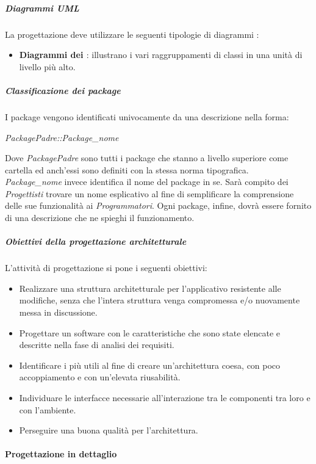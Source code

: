 \subparagraph{Diagrammi UML}
La progettazione deve utilizzare le seguenti tipologie di diagrammi :
\begin{itemize}
\item
\textbf{Diagrammi dei \textit{}}: illustrano i vari raggruppamenti di classi in una unità di livello più alto.
\end{itemize}

\subparagraph{Classificazione dei package}
I package vengono identificati univocamente da una descrizione nella forma:
\begin{center}
\textit{PackagePadre::Package\_nome}
\end{center}

Dove \textit{PackagePadre} sono tutti i package che stanno a livello superiore come cartella ed anch'essi sono definiti con la stessa norma tipografica. \\
\textit{Package\_nome} invece identifica il nome del package in se. Sarà compito dei \textit{Progettisti} trovare un nome esplicativo al fine di semplificare la comprensione delle sue funzionalità ai \textit{Programmatori}. Ogni package, infine, dovrà essere fornito di una descrizione che ne spieghi il funzionamento.

\subparagraph{Obiettivi della progettazione architetturale}
L'attività di progettazione si pone i seguenti obiettivi:
\begin{itemize}
\item Realizzare una struttura architetturale per l'applicativo  resistente alle modifiche, senza che l'intera struttura venga compromessa e/o nuovamente messa in discussione.
\item Progettare un software con le caratteristiche che sono state elencate e descritte nella fase di analisi dei requisiti.
\item Identificare i  più utili al fine di creare un'architettura coesa, con poco accoppiamento e con un'elevata riusabilità.
\item Individuare le interfacce necessarie all'interazione tra le componenti tra loro e con l'ambiente.
\item Perseguire una buona qualità per l'architettura.
\end{itemize}

\paragraph{Progettazione in dettaglio}

